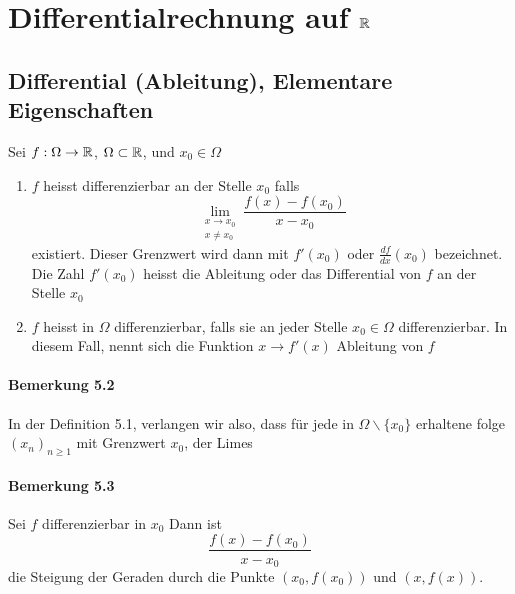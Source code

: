 \chapter{Differentialrechnung auf $\mathbb{R}$}
\section{Differential (Ableitung), Elementare Eigenschaften}
\begin{definition}{5.1}
Sei $f:\Omega\to\mathbb{R}$, $\Omega\subset\mathbb{R}$, und $x_0\in\Omega$
\begin{enumerate}
\item $f$ heisst differenzierbar an der Stelle $x_0$ falls 
\[\mathop {\lim }\limits_{\begin{array}{*{20}{c}}
{x \to {x_0}}\\
{x\not  = {x_0}}
\end{array}} \frac{{f\left( x \right) - f\left( {{x_0}} \right)}}{{x - {x_0}}}\]
existiert. Dieser Grenzwert wird dann mit $f'\left( x_0\right)$ oder $\frac{df}{dx}\left( x_0\right)$ bezeichnet. Die Zahl $f'\left( x_0\right)$ heisst die Ableitung oder das Differential von $f$ an der Stelle $x_0$
\item $f$ heisst in $\Omega$ differenzierbar, falls sie an jeder Stelle $x_0\in\Omega$ differenzierbar. In diesem Fall, nennt sich die Funktion $x\to f'(x)$ Ableitung von $f$
\end{enumerate}
\end{definition}
\subsubsection*{Bemerkung 5.2}
In der Definition 5.1, verlangen wir also, dass für jede in $\Omega \backslash\{ x_0\}$ erhaltene folge $\left( x_n\right)_{n\geq 1}$ mit Grenzwert $x_0$, der Limes 
\subsubsection*{Bemerkung 5.3}
Sei $f$ differenzierbar in $x_0$ 
Dann ist \[\frac{{f\left( x \right) - f\left( {{x_0}} \right)}}{{x - {x_0}}}\] die Steigung der Geraden durch die Punkte $\left( x_0,f\left( x_0\right) \right)$ und $\left( x,f\left( x\right) \right)$.\\

